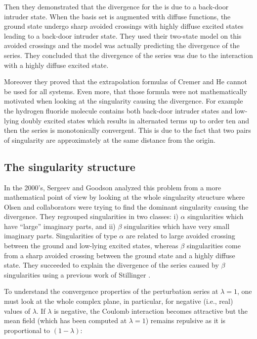 \documentclass[11pt,a4paper]{article}
\begin{document}
Then they demonstrated that the divergence for the  is due to a back-door intruder state. When the basis set is augmented with diffuse functions, the ground state undergo sharp avoided crossings with highly diffuse excited states leading to a back-door intruder state. They used their two-state model on this avoided crossings and the model was actually predicting the divergence of the series. They concluded that the divergence of the series was due to the interaction with a highly diffuse excited state. 

Moreover they proved that the extrapolation formulas of Cremer and He \cite{Cremer_1996} cannot be used for all systems. Even more, that those formula were not mathematically motivated when looking at the singularity causing the divergence. For example the hydrogen fluoride molecule contains both back-door intruder states and low-lying doubly excited states which results in alternated terms up to order ten and then the series is monotonically convergent. This is due to the fact that two pairs of singularity are approximately at the same distance from the origin.

\subsection{The singularity structure}

In the 2000's, Sergeev and Goodson \cite{Sergeev_2005, Sergeev_2006} analyzed this problem from a more mathematical point of view by looking at the whole singularity structure where Olsen and collaborators were trying to find the dominant singularity causing the divergence. They regrouped singularities in two classes: i) $\alpha$ singularities which have ``large'' imaginary parts, and ii) $\beta$ singularities which have very small imaginary parts. Singularities of type $\alpha$ are related to large avoided crossing between the ground and low-lying excited states, whereas $\beta$ singularities come from a sharp avoided crossing between the ground state and a highly diffuse state. They succeeded to explain the divergence of the series caused by $\beta$ singularities using a previous work of Stillinger \cite{Stillinger_2000}. 

To understand the convergence properties of the perturbation series at $\lambda=1$, one must look at the whole complex plane, in particular, for negative (i.e., real) values of $\lambda$. If $\lambda$ is negative, the Coulomb interaction becomes attractive but the mean field (which has been computed at $\lambda = 1$) remains repulsive as it is proportional to $(1-\lambda)$:
\end{document}
